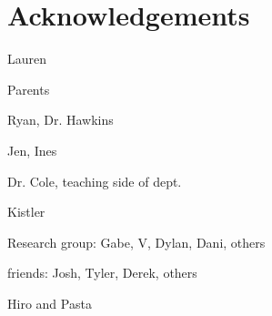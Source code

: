 \chapter*{Acknowledgements}
{}


Lauren

Parents

Ryan, Dr. Hawkins

Jen, Ines

Dr. Cole, teaching side of dept.

Kistler

Research group: Gabe, V, Dylan, Dani, others

friends: Josh, Tyler, Derek, others

Hiro and Pasta
